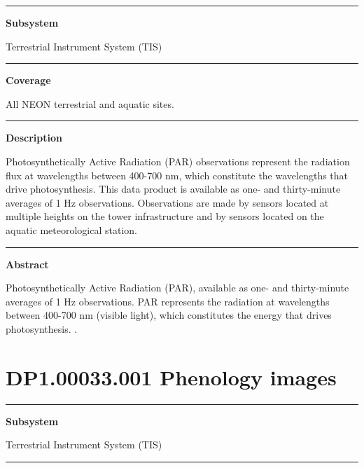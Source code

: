 \documentclass[]{article}
\begin{document}
\begin{center}\rule{0.5\linewidth}{\linethickness}\end{center}

\textbf{Subsystem}

Terrestrial Instrument System (TIS)

\begin{center}\rule{0.5\linewidth}{\linethickness}\end{center}

\textbf{Coverage}

All NEON terrestrial and aquatic sites.

\begin{center}\rule{0.5\linewidth}{\linethickness}\end{center}

\textbf{Description}

Photosynthetically Active Radiation (PAR) observations represent the
radiation flux at wavelengths between 400-700 nm, which constitute the
wavelengths that drive photosynthesis. This data product is available as
one- and thirty-minute averages of 1 Hz observations. Observations are
made by sensors located at multiple heights on the tower infrastructure
and by sensors located on the aquatic meteorological station.

\begin{center}\rule{0.5\linewidth}{\linethickness}\end{center}

\textbf{Abstract}

Photosynthetically Active Radiation (PAR), available as one- and
thirty-minute averages of 1 Hz observations. PAR represents the
radiation at wavelengths between 400-700 nm (visible light), which
constitutes the energy that drives photosynthesis. \newpage
.

\section{DP1.00033.001 Phenology
images}\label{dp1.00033.001-phenology-images}

\begin{center}\rule{0.5\linewidth}{\linethickness}\end{center}

\textbf{Subsystem}

Terrestrial Instrument System (TIS)

\begin{center}\rule{0.5\linewidth}{\linethickness}\end{center}
\end{document}
